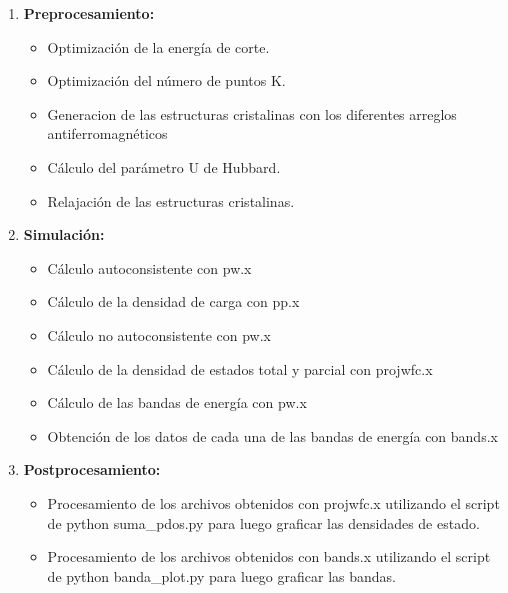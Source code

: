 \begin{enumerate}
    \item \textbf{Preprocesamiento:}
    \begin{itemize}
        \item Optimizaci\'on de la energ\'ia de corte.
        \item Optimizaci\'on del n\'umero de puntos K.
        \item Generacion de las estructuras cristalinas con los diferentes 
        arreglos antiferromagn\'eticos
        \item C\'alculo del par\'ametro U de Hubbard.
        \item Relajaci\'on de las estructuras cristalinas.
    \end{itemize}
    \item \textbf{Simulaci\'on:}
    \begin{itemize}
        \item C\'alculo autoconsistente con pw.x
        \item C\'alculo de la densidad de carga con pp.x
        \item C\'alculo no autoconsistente con pw.x
        \item C\'alculo de la densidad de estados total y parcial con 
        projwfc.x
        \item C\'alculo de las bandas de energ\'ia con pw.x
        \item Obtenci\'on de los datos de cada una de las bandas de 
        energ\'ia con bands.x
    \end{itemize}
    \item \textbf{Postprocesamiento:}
    \begin{itemize}
        \item Procesamiento de los archivos obtenidos con projwfc.x 
        utilizando el script de python suma\_pdos.py para luego graficar 
        las densidades de estado.
        \item Procesamiento de los archivos obtenidos con bands.x 
        utilizando el script de python banda\_plot.py para luego graficar 
        las bandas.
    \end{itemize}
\end{enumerate}